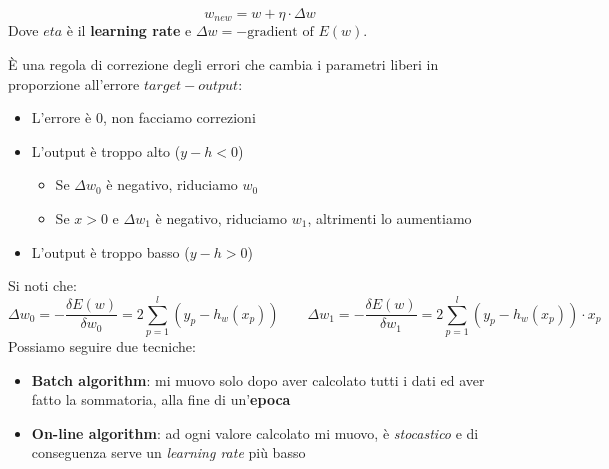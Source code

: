 \begin{equation}
	w_{new} = w + \eta \cdot \Delta w
\end{equation}
Dove $eta$ è il \textbf{learning rate} e $\Delta w = - \text{gradient of }E(w)$.
\begin{definition}
	È una regola di correzione degli errori che cambia i parametri liberi in proporzione all'errore $target-output$:
	\begin{itemize}
		\item L'errore è $0$, non facciamo correzioni
		\item L'output è troppo alto ($y-h<0$)
		\begin{itemize}
			\item Se $\Delta w_0$ è negativo, riduciamo $w_0$
			\item Se $x>0$ e $\Delta w_1$ è negativo, riduciamo $w_1$, altrimenti lo aumentiamo
		\end{itemize}
		\item L'output è troppo basso ($y-h>0$)
	\end{itemize}
\end{definition}
\noindent Si noti che:
\begin{equation}
	\Delta w_0 = -\frac{\delta E(w)}{\delta w_0} = 2\sum_{p=1}^{l}(y_p - h_w(x_p)) \quad\quad\Delta w_1 = -\frac{\delta E(w)}{\delta w_1} = 2\sum_{p=1}^{l}(y_p - h_w(x_p)) \cdot x_p
\end{equation}
Possiamo seguire due tecniche:
\begin{itemize}
	\label{def:batch_online}
	\item \textbf{Batch algorithm}: mi muovo solo dopo aver calcolato tutti i dati ed aver fatto la sommatoria, alla fine di un'\textbf{epoca}
	\item \textbf{On-line algorithm}: ad ogni valore calcolato mi muovo, è \textit{stocastico} e di conseguenza serve un \textit{learning rate} più basso
\end{itemize}
